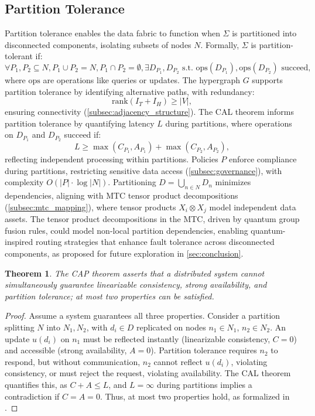 \documentclass{amsart}
\newtheorem{thm}{Theorem}
\begin{document}
\subsection{Partition Tolerance} \label{subsubsec:partition_tolerance}
Partition tolerance enables the data fabric to function when \( \Sigma \) is partitioned into disconnected components, isolating subsets of nodes \( N \). Formally, \( \Sigma \) is partition-tolerant if:
\[
\forall P_1, P_2 \subseteq N, P_1 \cup P_2 = N, P_1 \cap P_2 = \emptyset, \exists D_{P_1}, D_{P_2} \text{ s.t. } \text{ops}(D_{P_1}), \text{ops}(D_{P_2}) \text{ succeed},
\]
where \( \text{ops} \) are operations like queries or updates. The hypergraph \( G \) supports partition tolerance by identifying alternative paths, with redundancy:
\[
\text{rank}(I_T + I_H) \geq |V|,
\]
ensuring connectivity (\cref{subsec:adjacency_structure}). The CAL theorem informs partition tolerance by quantifying latency \( L \) during partitions, where operations on \( D_{P_1} \) and \( D_{P_2} \) succeed if:
\[
L \geq \max(C_{P_1}, A_{P_1}) + \max(C_{P_2}, A_{P_2}),
\]
reflecting independent processing within partitions. Policies \( P \) enforce compliance during partitions, restricting sensitive data access (\cref{subsec:governance}), with complexity \( O(|P| \cdot \log |N|) \). Partitioning \( D = \bigcup_{n \in N} D_n \) minimizes dependencies, aligning with MTC tensor product decompositions (\cref{subsec:mtc_mapping}), where tensor products \( X_i \otimes X_j \) model independent data assets.
The tensor product decompositions in the MTC, driven by quantum group fusion rules, could model non-local partition dependencies, enabling quantum-inspired routing strategies that enhance fault tolerance across disconnected components, as proposed for future exploration in \cref{sec:conclusion}.
\begin{thm} \label{thm:cap_theorem}
The CAP theorem asserts that a distributed system cannot simultaneously guarantee linearizable consistency, strong availability, and partition tolerance; at most two properties can be satisfied.
\end{thm}



\begin{proof}
Assume a system guarantees all three properties. Consider a partition splitting \( N \) into \( N_1, N_2 \), with \( d_i \in D \) replicated on nodes \( n_1 \in N_1 \), \( n_2 \in N_2 \). An update \( u(d_i) \) on \( n_1 \) must be reflected instantly (linearizable consistency, \( C = 0 \)) and accessible (strong availability, \( A = 0 \)). Partition tolerance requires \( n_2 \) to respond, but without communication, \( n_2 \) cannot reflect \( u(d_i) \), violating consistency, or must reject the request, violating availability. The CAL theorem quantifies this, as \( C + A \leq L \), and \( L = \infty \) during partitions implies a contradiction if \( C = A = 0 \). Thus, at most two properties hold, as formalized in \cite{GilbertLynch2002}.
\end{proof}
\end{document}
